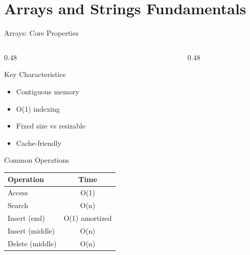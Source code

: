 \documentclass[aspectratio=169,xcolor=dvipsnames]{beamer}
\begin{document}
\section{Arrays and Strings Fundamentals}

\begin{frame}{Arrays: Core Properties}
  \begin{columns}
    \begin{column}{0.48\textwidth}
      \begin{block}{Key Characteristics}
        \begin{itemize}
          \item Contiguous memory
          \item O(1) indexing
          \item Fixed size vs resizable
          \item Cache-friendly
        \end{itemize}
      \end{block}

      \vspace{0.2cm}

      \begin{block}{Common Operations}
        \begin{tabular}{l|c}
          \textbf{Operation} & \textbf{Time} \\
          \hline
          Access & O(1) \\
          Search & O(n) \\
          Insert (end) & O(1) amortized \\
          Insert (middle) & O(n) \\
          Delete (middle) & O(n) \\
        \end{tabular}
      \end{block}
    \end{column}
    \begin{column}{0.48\textwidth}
\end{column}
\end{columns}
\end{frame}
\end{document}
